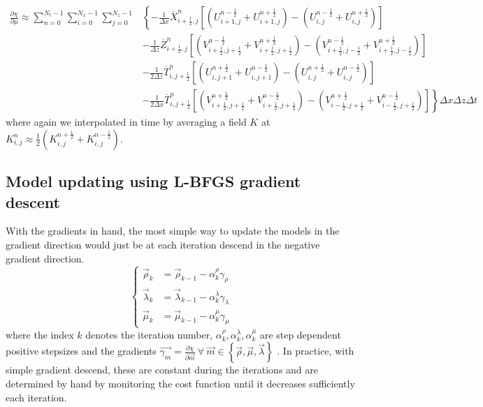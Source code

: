 \documentclass[10pt]{SelfArx} %
\newcommand{\pder}[2][]{\frac{\partial#1}{\partial#2}}
\theoremstyle{definition}
\begin{document}
\begin{equation}\label{eq:discrete_gradient_mu_written_out}
\begin{aligned}
\pder[\chi]{\mu} \approx \sum_{n=0}^{N_t-1}\sum_{i=0}^{N_x-1}\sum_{j=0}^{N_z-1}&\left\{ -\frac{1}{\Delta x}\overline{X}^n_{i+\frac{1}{2}, j} \left[\left(U^{n-\frac{1}{2}}_{i+1,j} + U^{n+\frac{1}{2}}_{i+1,j}\right) - \left(U^{n-\frac{1}{2}}_{i,j} + U^{n+\frac{1}{2}}_{i,j}\right)\right]\right. \\
&\left.-  \frac{1}{\Delta z}\overline{Z}^n_{i+\frac{1}{2}, j}\left[\left(V^{n-\frac{1}{2}}_{i+\frac{1}{2},j+\frac{1}{2}} + V^{n+\frac{1}{2}}_{i+\frac{1}{2},j+\frac{1}{2}}\right) - \left(V^{n-\frac{1}{2}}_{i+\frac{1}{2},j-\frac{1}{2}} + V^{n+\frac{1}{2}}_{i+\frac{1}{2},j-\frac{1}{2}}\right)\right]  \right.\\
&\left.-\frac{1}{2\Delta z}\overline{T}^n_{i,j+\frac{1}{2}}\left[\left(U^{n+\frac{1}{2}}_{i,j+1} + U^{n-\frac{1}{2}}_{i,j+1}\right) - \left(U^{n+\frac{1}{2}}_{i,j} + U^{n-\frac{1}{2}}_{i,j}\right)  \right]\right.\\
& \left.-\frac{1}{2\Delta x}\overline{T}^n_{i,j+\frac{1}{2}}\left[\left(V^{n+\frac{1}{2}}_{i+\frac{1}{2},j+\frac{1}{2}} + V^{n-\frac{1}{2}}_{i+\frac{1}{2},j+\frac{1}{2}}\right) - \left(V^{n+\frac{1}{2}}_{i-\frac{1}{2},j+\frac{1}{2}} + V^{n-\frac{1}{2}}_{i-\frac{1}{2},j+\frac{1}{2}}\right)  \right]\right\}\Delta x \Delta z \Delta t
\end{aligned}
\end{equation}
where again we interpolated in time by averaging a field $K$ at $K^n_{i,j} \approx \frac{1}{2}\left(K^{n+\frac{1}{2}}_{i,j} + K^{n-\frac{1}{2}}_{i,j}\right)$.
\subsection{Model updating using L-BFGS gradient descent}
With the gradients in hand, the most simple way to update the models in the gradient direction would just be at each iteration descend in the negative gradient direction. 
\begin{equation}\label{eq:simplest_gradient_descend}
\left\{
\begin{aligned}
\vec{\rho}_k &= \vec{\rho}_{k-1} - \alpha^{\rho}_k\gamma_\rho \\
\vec{\lambda}_k &= \vec{\lambda}_{k-1} - \alpha^{\lambda}_k\gamma_\lambda \\
\vec{\mu}_k &= \vec{\mu}_{k-1} - \alpha^{\mu}_k\gamma_\mu
\end{aligned}
\right.
\end{equation}
where the index $k$ denotes the iteration number, $\alpha^{\rho}_k, \alpha^{\lambda}_k, \alpha^{\mu}_k $ are step dependent positive stepsizes and the gradients $\vec{\gamma_m}=\pder[\chi]{\vec{m}}\ \forall\  \vec{m} \in \left\{\vec{\rho},\vec{\mu},\vec{\lambda}\right\}$ . In practice, with simple gradient descend, these are constant during the iterations and are determined by hand by monitoring the cost function until it decreases sufficiently each iteration.
\end{document}
